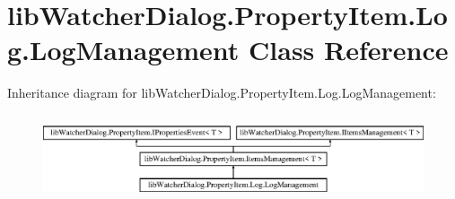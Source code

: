 \hypertarget{classlib_watcher_dialog_1_1_property_item_1_1_log_1_1_log_management}{\section{lib\+Watcher\+Dialog.\+Property\+Item.\+Log.\+Log\+Management Class Reference}
\label{classlib_watcher_dialog_1_1_property_item_1_1_log_1_1_log_management}
}
Inheritance diagram for lib\+Watcher\+Dialog.\+Property\+Item.\+Log.\+Log\+Management\+:\begin{figure}[H]
\begin{center}
\leavevmode
\includegraphics[height=2.553191cm]{classlib_watcher_dialog_1_1_property_item_1_1_log_1_1_log_management}
\end{center}
\end{figure}
